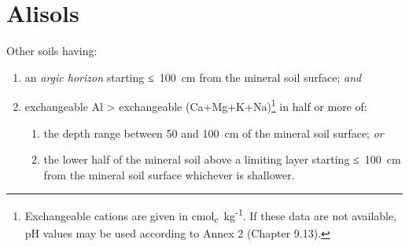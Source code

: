 \documentclass[
  letterpaper,
  DIV=11,
  numbers=noendperiod]{scrreprt}
\providecommand{\tightlist}{%
  \setlength{\itemsep}{0pt}\setlength{\parskip}{0pt}}\usepackage{longtable,booktabs,array}
\begin{document}
\hypertarget{key-alisols}{%
\chapter{Alisols}\label{key-alisols}}

Other soils having:

\begin{enumerate}
\def\labelenumi{\arabic{enumi}.}
\tightlist
\item
  an \emph{argic horizon} starting ≤~100~cm from the mineral soil
  surface; \emph{and}
\item
  exchangeable Al \textgreater{} exchangeable (Ca+Mg+K+Na)\footnote{Exchangeable
    cations are given in cmol\textsubscript{c}~kg\textsuperscript{-1}.
    If these data are not available, pH values may be used according to
    Annex 2 (Chapter 9.13).} in half or more of:

  \begin{enumerate}
  \def\labelenumii{\alph{enumii}.}
  \tightlist
  \item
    the depth range between 50 and 100~cm of the mineral soil surface;
    \emph{or}
  \item
    the lower half of the mineral soil above a limiting layer starting
    ≤~100~cm from the mineral soil surface whichever is shallower.
  \end{enumerate}
\end{enumerate}
\end{document}
